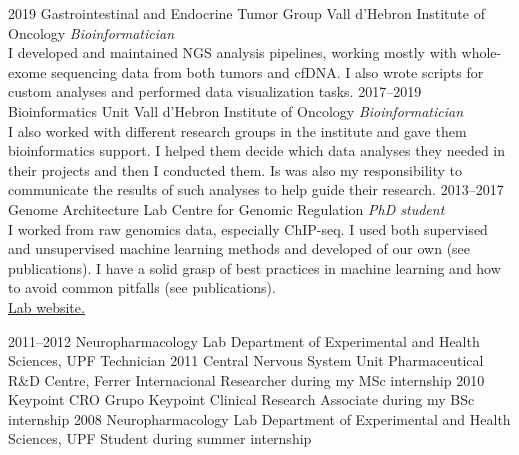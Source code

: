 \documentclass[]{friggeri-cv} %
\begin{document}
\begin{entrylist}

  \entry
    {2019}
    {Gastrointestinal and Endocrine Tumor Group}
    {Vall d'Hebron Institute of Oncology}
    {\emph{Bioinformatician}\\
    I developed and maintained NGS analysis pipelines,
    working mostly with whole-exome sequencing data from both
    tumors and cfDNA. I also wrote scripts for custom
    analyses and performed data visualization tasks.
    }
  \entry
    {2017--2019}
    {Bioinformatics Unit}
    {Vall d'Hebron Institute of Oncology}
    {\emph{Bioinformatician}\\
    I also worked with different research groups in the institute
    and gave them bioinformatics support. I helped them decide
    which data analyses they needed in their projects and then
    I conducted them. Is was also my responsibility to
    communicate the results of such analyses to help guide
    their research.
    }
  \entry
    {2013--2017}
    {Genome Architecture Lab}
    {Centre for Genomic Regulation}
    {\emph{PhD student}\\
    I worked from raw genomics data, especially ChIP-seq.
    I used both supervised
    and unsupervised machine learning methods and developed of our
    own (see publications). I have a solid grasp of best practices in
    machine learning and how to avoid common pitfalls (see
    publications).\\
    \href{http://www.genomearchitecture.com}{{\FA \faExternalLink} Lab website.}}
\end{entrylist}
\begin{entrylist}
  \entry
    {2011--2012}
    {Neuropharmacology Lab}
    {Department of Experimental and Health Sciences, UPF}
    {Technician}
  \entry
    {2011}
    {Central Nervous System Unit}
    {Pharmaceutical R\&D Centre, Ferrer Internacional}
    {Researcher during my MSc internship}
  \entry
    {2010}
    {Keypoint CRO}
    {Grupo Keypoint}
    {Clinical Research Associate during my BSc internship}
  \entry
    {2008}
    {Neuropharmacology Lab}
    {Department of Experimental and Health Sciences, UPF}
    {Student during summer internship}

\end{entrylist}

\end{document}
